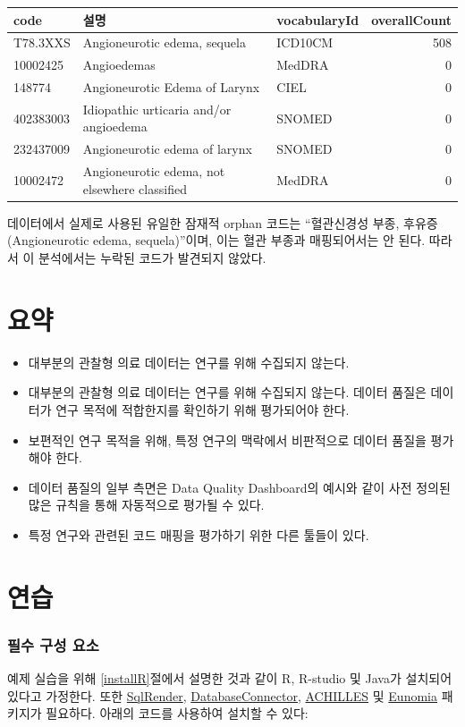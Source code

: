 \documentclass[11pt]{book}
\theoremstyle{definition}
\theoremstyle{definition}
\theoremstyle{definition}
\theoremstyle{remark}
\let\BeginKnitrBlock\begin \let\EndKnitrBlock\end
\begin{document}
\begin{longtable}[]{@{}lllr@{}}
\toprule
code & 설명 & vocabularyId & overallCount\tabularnewline
\midrule
\endhead
T78.3XXS & Angioneurotic edema, sequela & ICD10CM & 508\tabularnewline
10002425 & Angioedemas & MedDRA & 0\tabularnewline
148774 & Angioneurotic Edema of Larynx & CIEL & 0\tabularnewline
402383003 & Idiopathic urticaria and/or angioedema & SNOMED &
0\tabularnewline
232437009 & Angioneurotic edema of larynx & SNOMED & 0\tabularnewline
10002472 & Angioneurotic edema, not elsewhere classified & MedDRA &
0\tabularnewline
\bottomrule
\end{longtable}

데이터에서 실제로 사용된 유일한 잠재적 orphan 코드는 ``혈관신경성 부종,
후유증(Angioneurotic edema, sequela)''이며, 이는 혈관 부종과
매핑되어서는 안 된다. 따라서 이 분석에서는 누락된 코드가 발견되지
않았다.

\section{요약}\label{-13}

\BeginKnitrBlock{rmdsummary}
\begin{itemize}
\item
  대부분의 관찰형 의료 데이터는 연구를 위해 수집되지 않는다.
\item
  대부분의 관찰형 의료 데이터는 연구를 위해 수집되지 않는다. 데이터
  품질은 데이터가 연구 목적에 적합한지를 확인하기 위해 평가되어야 한다.
\item
  보편적인 연구 목적을 위해, 특정 연구의 맥락에서 비판적으로 데이터
  품질을 평가해야 한다.
\item
  데이터 품질의 일부 측면은 Data Quality Dashboard의 예시와 같이 사전
  정의된 많은 규칙을 통해 자동적으로 평가될 수 있다.
\item
  특정 연구와 관련된 코드 매핑을 평가하기 위한 다른 툴들이 있다.
\end{itemize}
\EndKnitrBlock{rmdsummary}

\section{연습}

\subsubsection*{필수 구성 요소}\label{--}

예제 실습을 위해 \ref{installR}절에서 설명한 것과 같이 R, R-studio 및
Java가 설치되어 있다고 가정한다. 또한
\href{https://ohdsi.github.io/SqlRender/}{SqlRender},
\href{https://ohdsi.github.io/DatabaseConnector/}{DatabaseConnector},
\href{https://github.com/OHDSI/Achilles}{ACHILLES} 및
\href{https://ohdsi.github.io/Eunomia/}{Eunomia} 패키지가 필요하다.
아래의 코드를 사용하여 설치할 수 있다:
\end{document}
